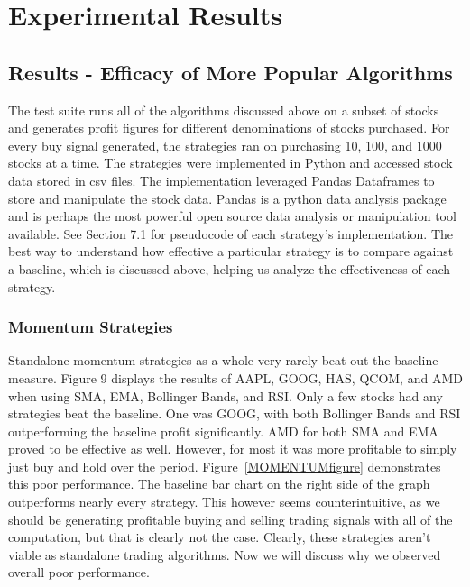 \documentclass[../thesis.tex]{subfiles}
\begin{document}
\chapter{Experimental Results}
\label{ch:experiments}

\section{Results - Efficacy of More Popular Algorithms}

The test suite runs all of the algorithms discussed above on a subset of stocks and generates profit figures for different denominations of stocks purchased. For every buy signal generated, the strategies ran on purchasing 10, 100, and 1000 stocks at a time. The strategies were implemented in Python and accessed stock data stored in csv files. The implementation leveraged Pandas Dataframes to store and manipulate the stock data. Pandas is a python data analysis package and is perhaps the most powerful open source data analysis or manipulation tool available. See Section 7.1 for pseudocode of each strategy's implementation.  The best way to understand how effective a particular strategy is to compare against a baseline, which is discussed above, helping us analyze the effectiveness of each strategy.   

\subsection{Momentum Strategies}

Standalone momentum strategies as a whole very rarely beat out the baseline measure. Figure 9 displays the results of AAPL, GOOG, HAS, QCOM, and AMD when using SMA, EMA, Bollinger Bands, and RSI. Only a few stocks had any strategies beat the baseline. One was GOOG, with both Bollinger Bands and RSI outperforming the baseline profit significantly. AMD for both SMA and EMA proved to be effective as well. However, for most it was more profitable to simply just buy and hold over the period. Figure~\ref{MOMENTUMfigure} demonstrates this poor performance. The baseline bar chart on the right side of the graph outperforms nearly every strategy. This however seems counterintuitive, as we should be generating profitable buying and selling trading signals with all of the computation, but that is clearly not the case.  Clearly, these strategies aren't viable as standalone trading algorithms. Now we will discuss why we observed overall poor performance.
\end{document}

